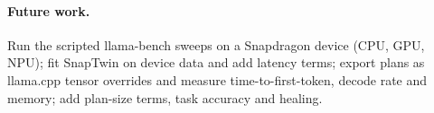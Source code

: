 \documentclass[10pt,a4paper]{article}
\begin{document}
\paragraph{Future work.} Run the scripted llama-bench sweeps on a Snapdragon device (CPU, GPU, NPU); fit SnapTwin on device data and add latency terms; export plans as llama.cpp tensor overrides and measure time-to-first-token, decode rate and memory; add plan-size terms, task accuracy and healing.

\small
\end{document}
